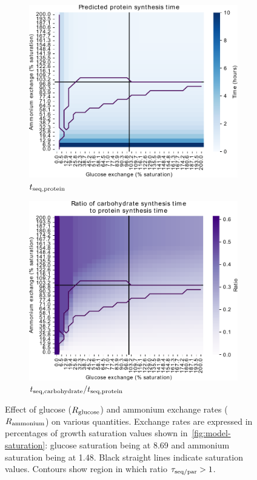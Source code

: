 \begin{figure}
  \begin{subfigure}[t]{0.45\textwidth}
  \centering
    \includegraphics[width=\linewidth]{ec_grid_glc_amm_prot}
    \caption{
      $t_{\mathrm{seq},\mathrm{protein}}$
    }
    \label{fig:model-grid-glc-prot}
  \end{subfigure}%
  \begin{subfigure}[t]{0.45\textwidth}
  \centering
    \includegraphics[width=\linewidth]{ec_grid_glc_amm_carb_to_prot}
    \caption{
      $t_{\mathrm{seq},\mathrm{carbohydrate}}/t_{\mathrm{seq},\mathrm{protein}}$
    }
    \label{fig:model-grid-glc-carb-to-prot}
  \end{subfigure}
  \caption{
    Effect of glucose ($R_{\mathrm{glucose}}$) and ammonium exchange rates ($R_{\mathrm{ammonium}}$) on various quantities.
    Exchange rates are expressed in percentages of growth saturation values shown in~\ref{fig:model-saturation}: glucose saturation being at \SI{8.69}{\mmolgdwh} and ammonium saturation being at \SI{1.48}{\mmolgdwh}.
    Black straight lines indicate saturation values.
    Contours show region in which ratio $\tau_{\mathrm{seq}/\mathrm{par}} > 1$.
  }
  \label{fig:model-grid-glc}
\end{figure}

